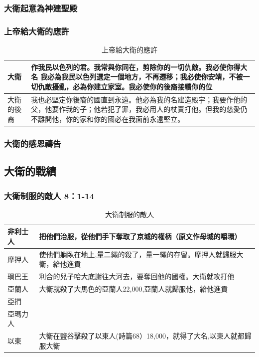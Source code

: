 \subsubsection{大衛起意為神建聖殿}
\subsubsection{上帝給大衛的應許}
\begin{table}[!hbp]
\centering 
\begin{tabular}{|p{}|p{}|}
\hline
\hline
大衛& 作我民以色列的君。我常與你同在，剪除你的一切仇敵。我必使你得大名
我必為我民以色列選定一個地方，不再遷移；我必使你安靖，不被一切仇敵擾亂，必為你建立家室。我必使你的後裔接續你的位 \\\hline
大衛的後裔& 我也必堅定你後裔的國直到永遠。他必為我的名建造殿宇；我要作他的父，他要作我的子；他若犯了罪，我必用人的杖責打他。但我的慈愛仍不離開他，你的家和你的國必在我面前永遠堅立。\\\hline
\end{tabular}
\caption{上帝給大衛的應許}
\end{table}

\subsubsection{大衛的感恩禱告}


\subsection{大衛的戰績}
\subsubsection{大衛制服的敵人 8：1-14}
\begin{table}[!hbp]
\centering 
\begin{tabular}{|p{}|p{}|}
\hline
\hline
非利士人& 把他們治服，從他們手下奪取了京城的權柄（原文作母城的嚼環） \\\hline
摩押人& 使他們躺臥在地上,量二繩的殺了，量一繩的存留。摩押人就歸服大衛，給他進貢\\\hline
瑣巴王& 利合的兒子哈大底謝往大河去，要奪回他的國權。大衛就攻打他\\\hline
亞蘭人& 大衛就殺了大馬色的亞蘭人22,000,亞蘭人就歸服他，給他進貢\\\hline
亞捫& \\\hline
亞瑪力人& \\\hline
以東& 大衛在鹽谷擊殺了以東人(詩篇68）18,000，就得了大名,以東人就都歸服大衛\\\hline
\end{tabular}
\caption{大衛制服的敵人}
\end{table}


